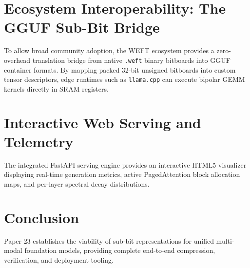 \documentclass[11pt,a4paper]{article}
\begin{document}
\section{Ecosystem Interoperability: The GGUF Sub-Bit Bridge}
To allow broad community adoption, the WEFT ecosystem provides a zero-overhead translation bridge from native \texttt{.weft} binary bitboards into GGUF container formats. By mapping packed 32-bit unsigned bitboards into custom tensor descriptors, edge runtimes such as \texttt{llama.cpp} can execute bipolar GEMM kernels directly in SRAM registers.

\section{Interactive Web Serving and Telemetry}
The integrated FastAPI serving engine provides an interactive HTML5 visualizer displaying real-time generation metrics, active PagedAttention block allocation maps, and per-layer spectral decay distributions.

\section{Conclusion}
Paper 23 establishes the viability of sub-bit representations for unified multi-modal foundation models, providing complete end-to-end compression, verification, and deployment tooling.
\end{document}
